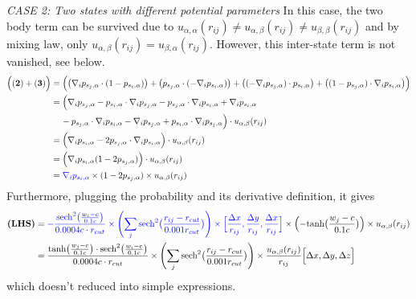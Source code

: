 \documentclass[11pt, oneside]{article}   	%
\begin{document}
\noindent
\textit{CASE 2: Two states with different potential parameters} In this case, the two body term can be survived due to $u_{\alpha, \alpha} (r_{ij}) \neq u_{\alpha, \beta} (r_{ij}) \neq  u_{\beta, \beta} (r_{ij})$ and by mixing law, only $u_{\alpha, \beta} (r_{ij}) = u_{\beta, \alpha} (r_{ij})$. However, this inter-state term is not vanished, see below.
\begin{align} \notag
\Bigl(\mathbf{(2)}+\mathbf{(3)}\Bigr) &= \Bigl( \bigl(\nabla_i p_{s_j,\alpha} \cdot (1-p_{s_i,\alpha})\bigr) + \bigl(p_{s_j,\alpha} \cdot (-\nabla_i p_{s_i,\alpha})\bigr) + \bigl((-\nabla_i p_{s_j,\alpha}) \cdot p_{s_i,\alpha}\bigr) + \bigl((1-p_{s_j,\alpha}) \cdot \nabla_i p_{s_i,\alpha}\bigr) \Bigr) \\ \notag
&= \Bigl( \nabla_i p_{s_j,\alpha} -p_{s_i,\alpha} \cdot \nabla_i p_{s_j,\alpha} - p_{s_j,\alpha} \cdot \nabla_i p_{s_i,\alpha}+  \nabla_i p_{s_i,\alpha} \\ \notag
& \quad \, -p_{s_j,\alpha} \cdot \nabla_i p_{s_i,\alpha}- \nabla_i p_{s_j,\alpha} + p_{s_i,\alpha} \cdot \nabla_i p_{s_j,\alpha} \Bigr) \cdot u_{\alpha,\beta}(r_{ij}) \\ \notag
&= \Bigl( \nabla_i p_{s_i, \alpha} - 2 p_{s_j,\alpha} \cdot \nabla_i p_{s_i,\alpha} \Bigr) \cdot u_{\alpha,\beta}(r_{ij}) \\ \notag
&= \Bigl (\nabla_i p_{s_i,\alpha}(1-2p_{s_j,\alpha})\Bigr)\cdot u_{\alpha,\beta}(r_{ij}) \\
&=  {\color{blue}\nabla_i p_{s_i,\alpha}} \times (1-2p_{s_j,\alpha}) \times  u_{\alpha,\beta}(r_{ij})
\end{align}
Furthermore, plugging the probability and its derivative definition, it gives
\begin{align}
\textbf{(LHS)} &= {\color{blue} - \frac{\textrm{sech}^2 \bigl( \frac{w_i-c}{0.1c} \bigr)  }{0.0004c\cdot r_{cut}} \times \Biggl( \sum_j \textrm{sech}^2 \bigl(\frac{r_{ij}-r_{cut}}{0.001r_{cut}}\bigr) \Biggr) \times \Big[\frac{\Delta x}{r_{ij}}, \frac{\Delta y}{r_{ij}}, \frac{\Delta x}{r_{ij}}\Big]} \times \Bigl(-\textrm{tanh} \bigl(\frac{w_j-c}{0.1c}\bigr)\Bigr) \times u_{\alpha,\beta}(r_{ij}) \\
&=\frac{ \textrm{tanh}\bigl(\frac{w_j-c}{0.1c}\bigr) \cdot \textrm{sech}^2 \bigl( \frac{w_i-c}{0.1c} \bigr)  }{0.0004c\cdot r_{cut}} \times \Biggl( \sum_j \textrm{sech}^2 \bigl(\frac{r_{ij}-r_{cut}}{0.001r_{cut}}\bigr) \Biggr) \times \frac{u_{\alpha,\beta}(r_{ij})}{r_{ij}} \Big[\Delta x, \Delta y, \Delta z\Big]
\end{align}
which doesn't reduced into simple expressions. 
\end{document}
